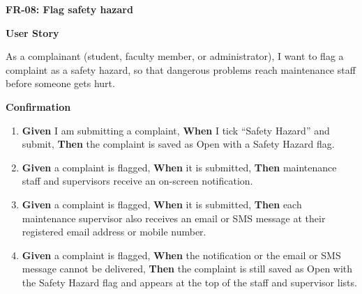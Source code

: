 \noindent\textbf{FR-08: Flag safety hazard}\par\nopagebreak[4]\smallskip
\noindent\textbf{User Story}\par\nopagebreak[4]
\noindent As a complainant (student, faculty member, or administrator), I want to flag a complaint as a safety hazard, so that dangerous problems reach maintenance staff before someone gets hurt.\par\smallskip
{\makeatletter
{}
\makeatother
\noindent\textbf{Confirmation}\par\nopagebreak[4]\vspace{-6pt}\nopagebreak[4]
\begin{enumerate}\setlength{\itemsep}{2pt}\setlength{\parsep}{0pt}\setlength{\topsep}{2pt}\setlength{\partopsep}{0pt}
  \item \textbf{Given} I am submitting a complaint, \textbf{When} I tick ``Safety Hazard'' and submit, \textbf{Then} the complaint is saved as Open with a Safety Hazard flag.
  \item \textbf{Given} a complaint is flagged, \textbf{When} it is submitted, \textbf{Then} maintenance staff and supervisors receive an on-screen notification.
  \item \textbf{Given} a complaint is flagged, \textbf{When} it is submitted, \textbf{Then} each maintenance supervisor also receives an email or SMS message at their registered email address or mobile number.
  \item \textbf{Given} a complaint is flagged, \textbf{When} the notification or the email or SMS message cannot be delivered, \textbf{Then} the complaint is still saved as Open with the Safety Hazard flag and appears at the top of the staff and supervisor lists.
\end{enumerate}}
\medskip
 
